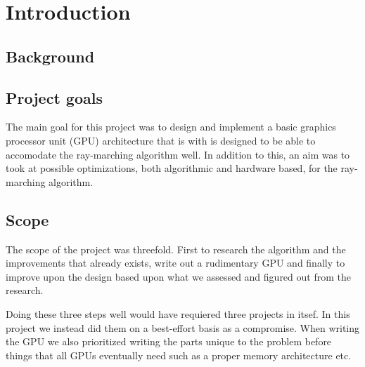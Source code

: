 \chapter{Introduction} 
	
	\section{Background}
	
	\section{Project goals}
		
		The main goal for this project was to design and implement a basic
		graphics processor unit (GPU) architecture that is with is designed to
		be able to accomodate the ray-marching algorithm well. In addition to
		this, an aim was to took at possible optimizations, both algorithmic
		and hardware based, for the ray-marching algorithm.
		
	\section{Scope}
		
		The scope of the project was threefold. First to research the algorithm and
		the improvements that already exists, write out a rudimentary GPU and
		finally to improve upon the design based upon what we assessed and figured
		out from the research.

		Doing these three steps well would have requiered three projects in itsef.
		In this project we instead did them on a best-effort basis as a compromise.
		When writing the GPU we also prioritized writing the parts unique to the
		problem before things that all GPUs eventually need such as a proper memory
		architecture etc.
